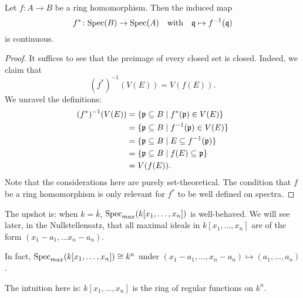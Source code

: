 \begin{prop}
  Let $f \colon A \to B$ be a ring homomorphism. Then the induced map
  \[f^* \colon \text{Spec}(B) \to \text{Spec}(A)
    \quad \text{with} \quad
    \mathfrak q \mapsto f^{-1}(\mathfrak q)\]
  is continuous.
\end{prop}
\begin{proof}
It suffices to see that the preimage of every closed set is closed. Indeed, we claim that
\[ (f^*)^{-1}(V(E)) = V(f(E)).\]
We unravel the definitions:
\begin{align*}
  (f^*)^{-1}(V(E)) & = \{ \mathfrak p \subseteq B \mathrel{|} f^*(\mathfrak p) \in V(E)\} \\
                   & = \{ \mathfrak p \subseteq B \mathrel{|} f^{-1}(\mathfrak p) \in V(E)\} \\
                   & = \{ \mathfrak p \subseteq B \mathrel{|} E \subseteq f^{-1}(\mathfrak p) \} \\
                   & = \{ \mathfrak p \subseteq B \mathrel{|} f(E) \subseteq \mathfrak p\} \\
                   & = V(f(E)).
\end{align*}
Note that the considerations here are purely set-theoretical. The condition that $f$ be a ring homomorphism is only relevant for $f^*$ to be well defined on spectra.
\end{proof}

The upshot is: when $k = \bar k$, $\text{Spec}_{max}(k[x_1, \ldots, x_n])$ is well-behaved. We will see later, in the Nullstellensatz, that all maximal ideals in $k[x_1, \ldots, x_n]$ are of the form $(x_1 - a_1, \ldots x_n - a_n)$.

In fact,
$\text{Spec}_{max}(k[x_1, \ldots, x_n]) \cong k^n$
under
$(x_1 - a_1, \ldots, x_n - a_n) \mapsto (a_1, \ldots, a_n)$.

The intuition here is: $k[x_1, \ldots, x_n]$ is the ring of regular functions on $k^n$.

